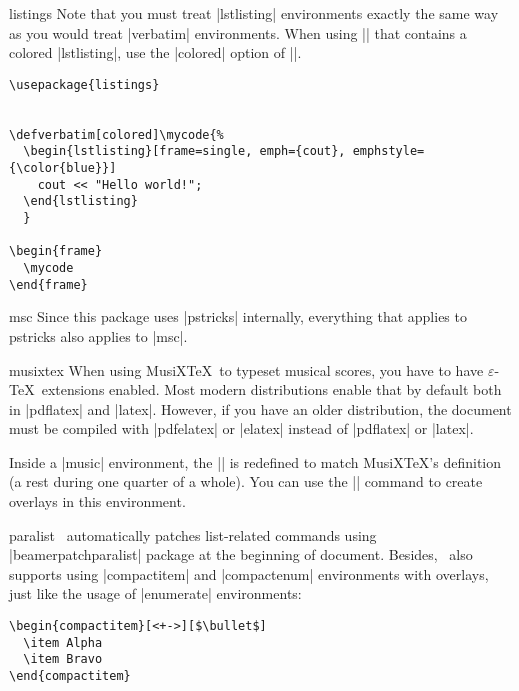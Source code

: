 \begin{package}{{listings}}
  \beamernote
  Note that you must treat |lstlisting| environments exactly the same way as you would treat |verbatim| environments. When using || that contains a colored |lstlisting|, use the |colored| option of ||.
  \example
\begin{verbatim}
\usepackage{listings}


\defverbatim[colored]\mycode{%
  \begin{lstlisting}[frame=single, emph={cout}, emphstyle={\color{blue}}]
    cout << "Hello world!";
  \end{lstlisting}
  }

\begin{frame}
  \mycode
\end{frame}

\end{verbatim}
\end{package}

\begin{package}{{msc}}
  \beamernote
  Since this package uses |pstricks| internally, everything that applies to pstricks also applies to |msc|.
\end{package}

\begin{package}{{musixtex}}
  When using MusiX\TeX\ to typeset musical scores, you have to have $\varepsilon$-\TeX\ extensions enabled. Most modern distributions enable that by default both in |pdflatex| and |latex|. However, if you have an older distribution, the document must be compiled with |pdfelatex| or |elatex| instead of |pdflatex| or |latex|.

  Inside a |music| environment, the |\pause| is redefined to match MusiX\TeX's definition (a rest during one quarter of a whole). You can use the |\beamerpause| command to create overlays in this environment.
\end{package}

\begin{package}{{paralist}}
  \beamernote
  \beamer\ automatically patches list-related commands using |beamerpatchparalist| package at the beginning of document. Besides, \beamer\ also supports using |compactitem| and |compactenum| environments with overlays, just like the usage of |enumerate| environments:
\begin{verbatim}
\begin{compactitem}[<+->][$\bullet$]
  \item Alpha
  \item Bravo
\end{compactitem}
\end{verbatim}
\end{package}

